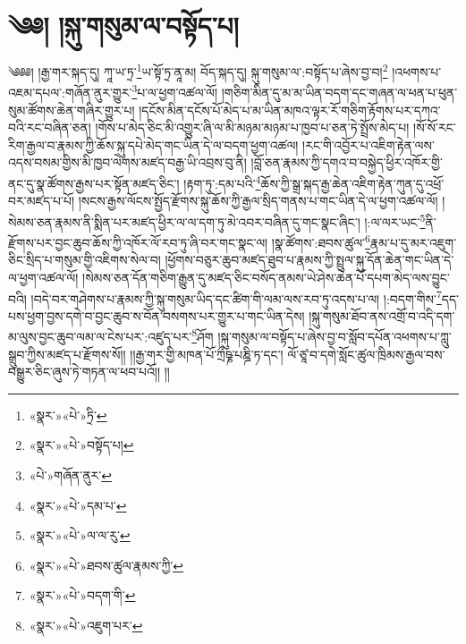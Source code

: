 \chapter{༄༅། །སྐུ་གསུམ་ལ་བསྟོད་པ།}༄༅༅། །རྒྱ་གར་སྐད་དུ། ཀཱ་ཡ་ཏྲ་\footnote{«སྣར་»«པེ་»ཏྲི་}ཡ་སྟོ་ཏྲ་ནཱ་མ། བོད་སྐད་དུ། སྐུ་གསུམ་ལ་:བསྟོད་པ་ཞེས་བྱ་བ།\footnote{«སྣར་»«པེ་»བསྟོད་པ།} །འཕགས་པ་འཇམ་དཔལ་:གཞོན་ནུར་གྱུར་\footnote{«པེ་»གཞོན་ནུར་}པ་ལ་ཕྱག་འཚལ་ལོ། །གཅིག་མིན་དུ་མ་མ་ཡིན་བདག་དང་གཞན་ལ་ཕན་པ་ཕུན་སུམ་ཚོགས་ཆེན་གཞིར་གྱུར་པ། །དངོས་མིན་དངོས་པོ་མེད་པ་མ་ཡིན་མཁའ་ལྟར་རོ་གཅིག་རྟོགས་པར་དཀའ་བའི་རང་བཞིན་ཅན། །གོས་པ་མེད་ཅིང་མི་འགྱུར་ཞི་ལ་མི་མཉམ་མཉམ་པ་ཁྱབ་པ་ཅན་ཏེ་སྤྲོས་མེད་པ། །སོ་སོ་རང་རིག་རྒྱལ་བ་རྣམས་ཀྱི་ཆོས་སྐུ་དཔེ་མེད་གང་ཡིན་དེ་ལ་བདག་ཕྱག་འཚལ། །རང་གི་འབྱོར་པ་འཇིག་རྟེན་ལས་འདས་བསམ་གྱིས་མི་ཁྱབ་ལེགས་མཛད་བརྒྱ་ཡི་འབྲས་བུ་ནི། །བློ་ཅན་རྣམས་ཀྱི་དགའ་བ་བསྐྱེད་ཕྱིར་འཁོར་གྱི་ནང་དུ་སྣ་ཚོགས་རྒྱས་པར་སྟོན་མཛད་ཅིང་། །རྟག་ཏུ་:དམ་པའི་\footnote{«སྣར་»«པེ་»དམ་པ་}ཆོས་ཀྱི་སྒྲ་སྐད་རྒྱ་ཆེན་འཇིག་རྟེན་ཀུན་དུ་འཕྲོ་བར་མཛད་པ་པོ། །སངས་རྒྱས་ལོངས་སྤྱོད་རྫོགས་སྐུ་ཆོས་ཀྱི་རྒྱལ་སྲིད་གནས་པ་གང་ཡིན་དེ་ལ་ཕྱག་འཚལ་ལོ། །སེམས་ཅན་རྣམས་ནི་སྨིན་པར་མཛད་ཕྱིར་ལ་ལ་དག་ཏུ་མེ་འབར་བཞིན་དུ་གང་སྣང་ཞིང་། །:ལ་ལར་ཡང་\footnote{«སྣར་»«པེ་»ལ་ལ་རུ་}ནི་རྫོགས་པར་བྱང་ཆུབ་ཆོས་ཀྱི་འཁོར་ལོ་རབ་ཏུ་ཞི་བར་གང་སྣང་ལ། །སྣ་ཚོགས་:ཐབས་ཚུལ་\footnote{«སྣར་»«པེ་»ཐབས་ཚུལ་རྣམས་ཀྱི་}རྣམ་པ་དུ་མར་འཇུག་ཅིང་སྲིད་པ་གསུམ་གྱི་འཇིགས་སེལ་བ། །ཕྱོགས་བཅུར་ཆུབ་མཛད་ཐུབ་པ་རྣམས་ཀྱི་སྤྲུལ་སྐུ་དོན་ཆེན་གང་ཡིན་དེ་ལ་ཕྱག་འཚལ་ལོ། །སེམས་ཅན་དོན་གཅིག་རྒྱུན་དུ་མཛད་ཅིང་བསོད་ནམས་ཡེ་ཤེས་ཆེན་པོ་དཔག་མེད་ལས་བྱུང་བའི། །བདེ་བར་གཤེགས་པ་རྣམས་ཀྱི་སྐུ་གསུམ་ཡིད་དང་ཚིག་གི་ལམ་ལས་རབ་ཏུ་འདས་པ་ལ། །:བདག་གིས་\footnote{«སྣར་»«པེ་»བདག་གི་}དད་པས་ཕྱག་བྱས་དགེ་བ་བྱང་ཆུབ་ས་བོན་བསགས་པར་གྱུར་པ་གང་ཡིན་དེས། །སྐུ་གསུམ་ཐོབ་ནས་འགྲོ་བ་འདི་དག་མ་ལུས་བྱང་ཆུབ་ལམ་ལ་ངེས་པར་:འཛུད་པར་\footnote{«སྣར་»«པེ་»འཇུག་པར་}ཤོག །སྐུ་གསུམ་ལ་བསྟོད་པ་ཞེས་བྱ་བ་སློབ་དཔོན་འཕགས་པ་ཀླུ་སྒྲུབ་ཀྱིས་མཛད་པ་རྫོགས་སོ།། །།རྒྱ་གར་གྱི་མཁན་པོ་ཀྲྀཥྞ་པཎྜི་ཏ་དང་། ལོ་ཙཱ་བ་དགེ་སློང་ཚུལ་ཁྲིམས་རྒྱལ་བས་བསྒྱུར་ཅིང་ཞུས་ཏེ་གཏན་ལ་ཕབ་པའོ།། །།